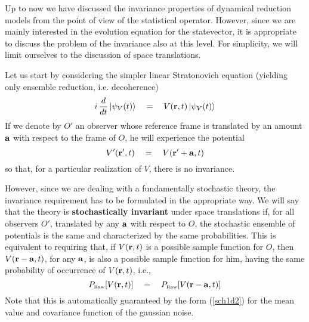 \documentclass[12pt]{article}
\begin{document}
Up to now we have discussed the invariance properties of dynamical
reduction models from the point of view of the statistical
operator. However, since we are mainly interested in the evolution
equation for the statevector, it is appropriate to discuss the
problem of the invariance also at this level. For simplicity, we
will limit ourselves to the discussion of space translations.

Let us start by considering the simpler linear Stratonovich
equation (yielding only ensemble reduction, i.e. decoherence)
\begin{equation} \label{sicdup}
i\, \frac{d}{dt}\, |\psi_{V}(t)\rangle \quad = \quad V({\bf r},
t)\, |\psi_{V}(t)\rangle
\end{equation}
If we denote by $O'$ an observer whose reference frame is
translated by an amount ${\bf a}$ with respect to the frame of
$O$, he will experience the potential
\begin{equation}
V'({\bf r}', t) \quad = \quad V({\bf r}' + {\bf a}, t)
\end{equation}
so that, for a particular realization of $V$, there is no
invariance.

However, since we are dealing with a fundamentally stochastic
theory, the invariance requirement has to be formulated in the
appropriate way. We will say that the theory is {\bf
stochastically invariant} under space translations if, for all
observers $O'$, translated by any ${\bf a}$ with respect to $O$,
the stochastic ensemble of potentials is the same and
characterized by the same probabilities. This is equivalent to
requiring that, if $V({\bf r}, t)$ is a possible sample function
for $O$, then $V({\bf r} - {\bf a}, t)$, for any ${\bf a}$, is
also a possible sample function for him, having the same
probability of occurrence of $V({\bf r}, t)$, i.e.,
\begin{equation} \label{lwbc}
P_{\makebox{\tiny Raw}}[V({\bf r},t)] \quad = \quad
P_{\makebox{\tiny Raw}}[V({\bf r} - {\bf a},t)]
\end{equation}
Note that this is automatically guaranteed by the form
(\ref{sch1d2}) for the mean value and covariance function of the
gaussian noise.
\end{document}

